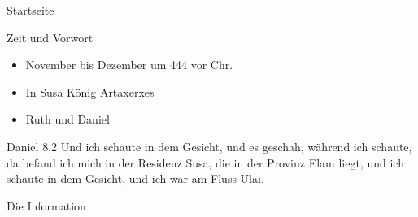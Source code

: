 \documentclass{beamer}
\author{Lothar Schmid}
\begin{document}
\begin{frame}{Startseite}
\titlepage
\end{frame}

\begin{frame}{Zeit und Vorwort}
   
    \begin{itemize}
        \item November bis Dezember um 444 vor Chr.
        \item In Susa König Artaxerxes
        \item Ruth und Daniel
    \end{itemize}
    \begin{block}{Daniel 8,2}
        Und ich schaute in dem Gesicht, und es geschah, während ich schaute, da befand ich mich in der Residenz Susa, die in der Provinz Elam liegt, und ich schaute in dem Gesicht, und ich war am Fluss Ulai.
    \end{block}   
\end{frame}
\begin{frame}{Die Information}
    
\end{frame}
\end{document}
